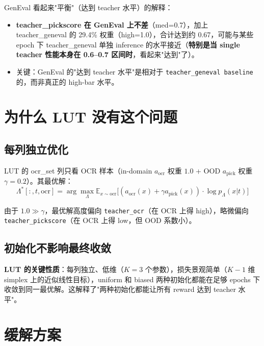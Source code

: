 \documentclass[11pt,a4paper]{article}
\newcommand{\E}{\mathbb{E}}
\begin{document}
GenEval 看起来"平衡"（达到 teacher 水平）的解释：
\begin{itemize}
    \item \textbf{teacher\_pickscore 在 GenEval 上不差}（med=0.7），加上 teacher\_geneval 的 29.4\% 权重（high=1.0），合计达到约 0.67，可能与某些 epoch 下 teacher\_geneval 单独 inference 的水平接近（\textbf{特别是当 single teacher 性能本身在 0.6--0.7 区间时}，看起来"达到"了）。
    \item 关键：GenEval 的"达到 teacher 水平"是相对于 \texttt{teacher\_geneval baseline} 的，而非真正的 high-bar 水平。
\end{itemize}

\section{为什么 LUT 没有这个问题}

\subsection{每列独立优化}

LUT 的 ocr\_set 列只看 OCR 样本（in-domain $a_{\text{ocr}}$ 权重 $1.0$ + OOD $a_{\text{pick}}$ 权重 $\gamma=0.2$）。其最优解：
\begin{equation}
\Lambda^*[:, t, \text{ocr}] = \arg\max_\Lambda \E_{x \sim \text{ocr}}\bigl[(a_{\text{ocr}}(x) + \gamma a_{\text{pick}}(x)) \cdot \log p_\Lambda(x|t)\bigr]
\end{equation}

由于 $1.0 \gg \gamma$，最优解高度偏向 \texttt{teacher\_ocr}（在 OCR 上得 high），略微偏向 \texttt{teacher\_pickscore}（在 OCR 上得 low，但 OOD 系数小）。

\subsection{初始化不影响最终收敛}

\textbf{LUT 的关键性质}：每列独立、低维（$K = 3$ 个参数），损失景观简单（$K{-}1$ 维 simplex 上的近似线性目标），uniform 和 biased 两种初始化都能在足够 epochs 下收敛到同一最优解。这解释了"两种初始化都能让所有 reward 达到 teacher 水平"。

\section{缓解方案}
\label{sec:mitigations}
\end{document}
